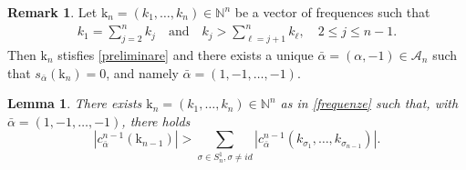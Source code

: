 \documentclass[12pt, reqno]{amsart}
\theoremstyle{plain}
\newtheorem {lemma}[theorem]{Lemma}
\theoremstyle{definition}
\newtheorem{remark}[theorem]{Remark}
\theoremstyle{remark}
\numberwithin{equation}{section}
\newcommand{\N}{\mathbb{N}}
\newcommand{\A}{\mathcal{A}}
\newcommand{\s}{\sigma}
\newcommand{\0}{\theta}
\renewcommand{\a}{\alpha}
\renewcommand{\k}{\kappa}
\newcommand{\1}{{-1}}
\renewcommand{\l}{\ell}
\renewcommand{\=}{\coloneqq}
\renewcommand{\.}{\dots}
\newcommand{\mc}{\mathcal}
\newcommand{\be}{\begin{equation}}
\newcommand{\ee}{\end{equation}}
\renewcommand{\A}{\mc A}
\renewcommand{\k}{\mathrm k}
\begin{document}
 
 
 
 \begin{remark}
 \label{rem:freq}
 Let $\k_n=(k_1,\dots, k_n)\in\N^n$ be a vector of frequences such that  
\begin{equation}
 \label{frequenze}
 \begin{split}
 k_1=\sum_{j=2}^nk_j\quad \textrm{and}
 \quad  k_j>\sum_{\l=j+1}^n k_\l, \quad 2\leq j\leq n-1. 
 \end{split} 
\end{equation}
 Then $\k_n$ stisfies \eqref{preliminare} and there exists a unique $\bar \a= (\a,-1)\in\A_n$ such that $s_{\bar\a}(\k_n)=0$, and namely
  $\bar \a = (1,-1,\dots,-1)$.
 \end{remark}
 
 
 
 \begin{lemma}
 \label{lemma85}
 There exists $\k_n=(k_1,\dots, k_n)\in\N^n$ as in \eqref{frequenze} such that, with  $\bar \a = (1,-1,\dots,-1)$, there holds
 \be
  \label{num1}
 | c_{\bar\a}^{n-1}(\k_{n-1})|>\sum_{\s\in S_n^1,  \s\neq id}  | c_{\bar\a}^{n-1}(k_{\s_1},  \dots, k_{\s _{n-1}})|.
 \ee
 \end{lemma}
 
\end{document}
